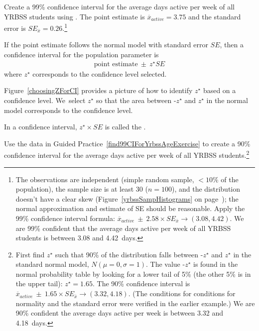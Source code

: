 \begin{spacing}{1.5}
\begin{exercise} \label{find99CIForYrbssAgeExercise}
Create a 99\% confidence interval for the average days active per week of all YRBSS students using . The point estimate is $\overline{x}_{active} = 3.75$ and the standard error is $SE_{\overline{x}} = 0.26$.\footnote{The observations are independent (simple random sample, $<10\%$ of the population), the sample size is at least 30 ($n = 100$), and the distribution doesn't have a clear skew (Figure~\ref{yrbssSampHistograms} on page~\pageref{yrbssSampHistograms}); the normal approximation and estimate of SE should be reasonable. Apply the 99\% confidence interval formula: $\overline{x}_{active}\ \pm\ 2.58 \times  SE_{\overline{x}} \rightarrow (3.08, 4.42)$. We are 99\% confident that the average days active per week of all YRBSS students is between 3.08 and 4.42~days.}
\end{exercise}

\begin{termBox}{
If the point estimate follows the normal model with standard error $SE$, then a confidence interval for the population parameter is
\begin{eqnarray*}
\text{point estimate}\ \pm\ z^{\star} SE
\end{eqnarray*}
where $z^{\star}$ corresponds to the confidence level selected.}
\end{termBox}

Figure~\ref{choosingZForCI} provides a picture of how to identify $z^{\star}$ based on a confidence level. We~select $z^{\star}$ so that the area between -$z^{\star}$ and $z^{\star}$ in the normal model corresponds to the confidence level. 

\begin{termBox}{
\label{marginOfErrorTermBox}In a confidence interval, $z^{\star}\times SE$ is called the .}
\end{termBox}

\textC{\newpage}

\begin{exercise} \label{find90CIForYrbssAgeExercise}
Use the data in Guided Practice~\ref{find99CIForYrbssAgeExercise} to create a 90\% confidence interval for the average days active per week of all YRBSS students.\footnote{First find $z^{\star}$ such that 90\% of the distribution falls between -$z^{\star}$ and $z^{\star}$ in the standard normal model, $N(\mu=0, \sigma=1)$. The value -$z^{\star}$ is found in the normal probability table by looking for a lower tail of 5\% (the other 5\% is in the upper tail): $z^{\star}=1.65$. The 90\% confidence interval is $\overline{x}_{active}\ \pm\ 1.65\times SE_{\overline{x}} \to (3.32, 4.18)$. (The conditions for  conditions for normality and the standard error were verified in the earlier example.)  
We are 90\% confident the average days active per week is between 3.32 and 4.18~days.}


\end{exercise}
\end{spacing}
